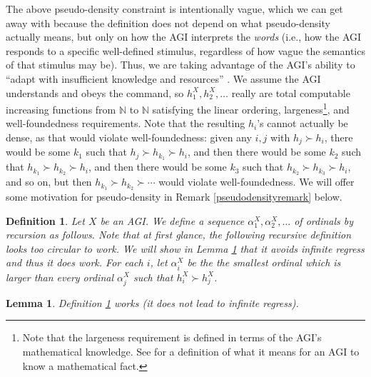 \documentclass{article}
\newtheorem{definition}[theorem]{Definition}
\newtheorem{lemma}[theorem]{Lemma}
\begin{document}
The above pseudo-density constraint is intentionally vague, which we can get away
with because the definition does not depend on what pseudo-density actually means,
but only on how the AGI interprets the \emph{words} (i.e., how the AGI responds to a
specific well-defined stimulus, regardless of how vague the semantics of that stimulus
may be).
Thus, we are taking advantage of the AGI's ability to ``adapt with insufficient
knowledge and resources'' \cite{wang2019defining}.
We assume the AGI understands and obeys the command, so $h^X_1,h^X_2,\ldots$ really are
total computable increasing functions from $\mathbb N$ to $\mathbb N$ satisfying the
linear ordering, largeness\footnote{Note that the largeness requirement is defined in
terms of the AGI's mathematical
knowledge. See \cite{alexanderinprep} for a definition of what
it means for an AGI to know a mathematical fact.}, and well-foundedness requirements.
Note that the resulting $h_i$'s
cannot actually be dense, as that would violate well-foundedness: given any $i,j$
with $h_j\succ h_i$, there would be some $k_1$ such that $h_j\succ h_{k_1}\succ h_i$,
and then there would be some $k_2$ such that $h_{k_1}\succ h_{k_2}\succ h_i$,
and then there would be some $k_3$ such that $h_{k_2}\succ h_{k_3}\succ h_i$, and so
on, but then $h_{k_1}\succ h_{k_2}\succ \cdots$ would violate well-foundedness.
We will offer some motivation for pseudo-density in
Remark \ref{pseudodensityremark} below.

\begin{definition}
\label{alphaidefn}
    Let $X$ be an AGI. We define a sequence $\alpha^X_1,\alpha^X_2,\ldots$
    of ordinals by recursion as follows. Note that at first glance,
    the following recursive definition looks too circular to work.
    We will show in Lemma \ref{transfiniterecursionmagiclemma} that
    it avoids infinite regress and thus
    it does work. For each $i$, let $\alpha^X_i$ be the the smallest
    ordinal which is larger than every ordinal $\alpha^X_j$ such that
    $h^X_i\succ h^X_j$.
\end{definition}

\begin{lemma}
\label{transfiniterecursionmagiclemma}
    Definition \ref{alphaidefn} works (it does not lead to infinite regress).
\end{lemma}
\end{document}
